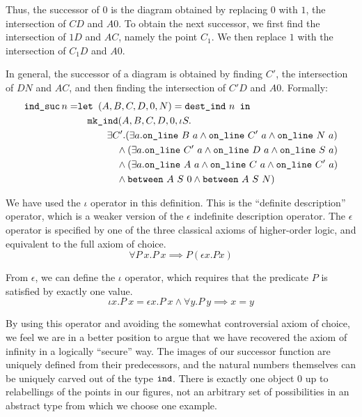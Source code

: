 Thus, the successor of $0$ is the diagram obtained by replacing $0$ with $1$, the intersection of $CD$ and $A0$. To obtain the next successor, we first find the intersection of $1D$ and $AC$, namely the point $C_1$. We then replace $1$ with the intersection of $C_1D$ and $A0$. 

In general, the successor of a diagram is obtained by finding $C'$, the intersection of $DN$ and $AC$, and then finding the intersection of $C'D$ and $A0$. Formally\label{sec:UseOfIota}:
\begin{align*}
\code{ind\_suc}\, n =& \code{let } (A,B,C,D,0,N) = \code{dest\_ind}\ n \code{ in}\\
&\quad \code{mk\_ind} (A,B,C,D,0,\iota S.\\
&\quad\qquad \exists C'. (\exists a. \online{B}{a} \wedge \online{C'}{a} \wedge \online{N}{a})\\
&\qquad\qquad \wedge (\exists a. \online{C'}{a} \wedge \online{D}{a} \wedge \online{S}{a})\\
&\qquad\qquad \wedge (\exists a. \online{A}{a} \wedge \online{C}{a} \wedge \online{C'}{a})\\
&\qquad\qquad \wedge \between{A}{S}{0} \wedge \between{A}{S}{N})
\end{align*}

We have used the $\iota$ operator in this definition. This is the ``definite description'' operator, which is a weaker version of the $\epsilon$ indefinite description operator. The $\epsilon$ operator is specified by one of the three classical axioms of higher-order logic, and equivalent to the full axiom of choice.
\begin{displaymath}
\forall P\ x. P\ x \implies P (\epsilon x. P x)
\end{displaymath}

From $\epsilon$, we can define the $\iota$ operator, which requires that the predicate $P$ is satisfied by exactly one value. 
\begin{displaymath}
  \iota x. P\ x = \epsilon x. P\ x \wedge \forall y. P\ y \implies x = y
\end{displaymath}

By using this operator and avoiding the somewhat controversial axiom of choice, we feel we are in a better position to argue that we have recovered the axiom of infinity in a logically ``secure'' way. The images of our successor function are uniquely defined from their predecessors, and the natural numbers themselves can be uniquely carved out of the type $\texttt{ind}$. There is exactly one object $0$ up to relabellings of the points in our figures, not an arbitrary set of possibilities in an abstract type from which we choose one example.


